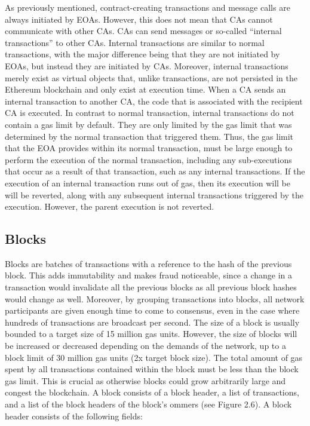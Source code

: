             As previously mentioned, contract-creating transactions and message calls are always initiated by EOAs.
            However, this does not mean that CAs cannot communicate with other CAs.
            CAs can send messages or so-called “internal transactions” to other CAs.
            Internal transactions are similar to normal transactions, with the major difference being that they are not initiated by EOAs, but instead they are initiated by CAs.
            Moreover, internal transactions merely exist as virtual objects that, unlike transactions, are not persisted in the Ethereum blockchain and only exist at execution time.
            When a CA sends an internal transaction to another CA, the code that is associated with the recipient CA is executed.
            In contrast to normal transaction, internal transactions do not contain a gas limit by default.
            They are only limited by the gas limit that was determined by the normal transaction that triggered them.
            Thus, the gas limit that the EOA provides within its normal transaction, must be large enough to perform the execution of the normal transaction, including any sub-executions that occur as a result of that transaction, such as any internal transactions.
            If the execution of an internal transaction runs out of gas, then its execution will be will be reverted, along with any subsequent internal transactions triggered by the execution.
            However, the parent execution is not reverted.


    \subsection{Blocks}

        Blocks are batches of transactions with a reference to the hash of the previous block.
        This adds immutability and makes fraud noticeable, since a change in a transaction would invalidate all the previous blocks as all previous block hashes would change as well.
        Moreover, by grouping transactions into blocks, all network participants are given enough time to come to consensus, even in the case where hundreds of transactions are broadcast per second.
        The size of a block is usually bounded to a target size of 15 million gas units.
        However, the size of blocks will be increased or decreased depending on the demands of the network, up to a block limit of 30 million gas units (2x target block size).
        The total amount of gas spent by all transactions contained within the block must be less than the block gas limit.
        This is crucial as otherwise blocks could grow arbitrarily large and congest the blockchain.
        A block consists of a block header, a list of transactions, and a list of the block headers of the block's ommers (see Figure 2.6).
        A block header consists of the following fields:

